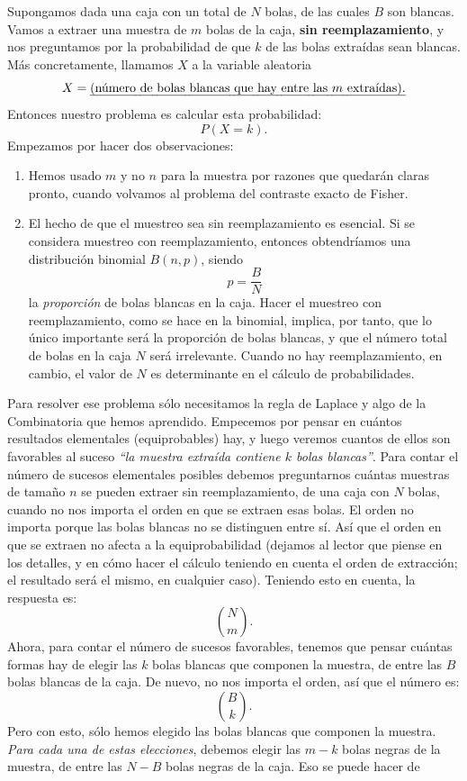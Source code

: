Supongamos dada una caja con un total de $N$ bolas, de las cuales $B$ son blancas. Vamos a extraer una muestra de $m$ bolas de la caja, {\bf sin reemplazamiento}, y nos preguntamos por la probabilidad de que $k$ de las bolas extraídas sean blancas. Más concretamente, llamamos $X$ a la variable aleatoria
\[X=\mbox{\em (número de bolas blancas que hay entre las $m$ extraídas).}\]
Entonces nuestro problema es calcular esta probabilidad:
\[P(X=k).\]
Empezamos por hacer dos observaciones:
\begin{enumerate}
  \item Hemos usado $m$ y no $n$ para la muestra por razones que quedarán claras pronto, cuando volvamos al problema del contraste exacto de Fisher.
  \item El hecho de que el muestreo sea sin reemplazamiento es esencial. Si se considera muestreo con reemplazamiento, entonces obtendríamos una distribución binomial $B(n,p)$, siendo
    \[p=\dfrac{B}{N}\]
    la {\em proporción} de bolas blancas en la caja. Hacer el muestreo con reemplazamiento, como se hace en la binomial, implica, por tanto, que lo único importante será la proporción de bolas blancas, y que el número total de bolas en la caja $N$ será irrelevante. Cuando no hay reemplazamiento, en cambio, el valor de $N$ es determinante en el cálculo de probabilidades.
\end{enumerate}
Para resolver ese problema sólo necesitamos la regla de Laplace y algo de la Combinatoria que hemos aprendido. Empecemos por pensar en cuántos resultados elementales (equiprobables) hay, y luego veremos cuantos de ellos son favorables al suceso {\em ``la muestra extraída contiene $k$ bolas blancas''}. Para contar el número de sucesos elementales posibles debemos preguntarnos cuántas muestras de tamaño $n$ se pueden extraer sin reemplazamiento, de una caja con $N$ bolas, cuando no nos importa el orden en que se extraen esas bolas. El orden no importa porque las bolas blancas no se distinguen entre sí. Así que el orden en que se extraen no afecta a la equiprobabilidad (dejamos al lector que piense en los detalles, y en cómo hacer el cálculo teniendo en cuenta el orden de extracción; el resultado será el mismo, en cualquier caso). Teniendo esto en cuenta, la respuesta es:
\[\binom{N}{m}.\]
Ahora, para contar el número de sucesos favorables, tenemos que pensar cuántas formas hay de elegir las $k$ bolas blancas que componen la muestra, de entre las $B$ bolas blancas de la caja. De nuevo, no nos importa el orden, así que el número es:
\[\binom{B}{k}.\]
Pero con esto, sólo hemos elegido las bolas blancas que componen la muestra. {\em Para cada una de estas elecciones}, debemos elegir las $m-k$ bolas negras de la muestra, de entre las $N-B$ bolas negras de la caja. Eso se puede hacer de
